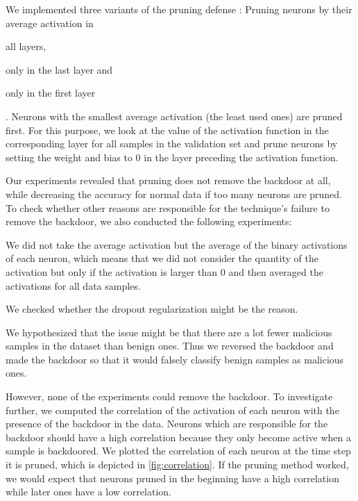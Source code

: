 \documentclass[9pt,sigconf,letterpaper,dvipsnames\ifx\removeHeaders\tempYes ,nonacm\fi]{acmart}
\begin{document}
We implemented three variants of the pruning defense \cite{gu_badnets:_2017}: Pruning neurons by their average activation in \begin{enumerate*}\item all layers, \item only in the last layer and \item only in the first layer \end{enumerate*}. Neurons with the smallest average activation (the least used ones) are pruned first. For this purpose, we look at the value of the activation function
in the corresponding layer for all samples in the validation set and prune neurons by setting the weight and bias to 0 in the layer preceding the activation function.

Our experiments revealed that pruning does not remove the backdoor at all, while decreasing the accuracy for normal data if too many neurons are pruned. To check whether other reasons are responsible for the technique's failure to remove the backdoor, we also conducted the following experiments: \begin{enumerate*} \item We did not take the average activation but the average of the binary activations of each neuron, which means that we did not consider the quantity of the activation but only if the activation is larger than 0 and then averaged the activations for all data samples. \item We checked whether the dropout regularization might be the reason. \item We hypothesized that the issue might be that there are a lot fewer malicious samples in the dataset than benign ones. Thus we reversed the backdoor and made the backdoor so that it would falsely classify benign samples as malicious ones.
\end{enumerate*}

However, none of the experiments could remove the backdoor.
To investigate further, we computed the correlation of the activation of each neuron with the presence of the backdoor in the data. Neurons which are responsible for the backdoor should have a high correlation because they only become active when a sample is backdoored. We  plotted the correlation of each neuron at the time step it is pruned, which is depicted in \autoref{fig:correlation}. If the pruning method worked, we would expect
that neurons pruned in the beginning have a high correlation while later ones have a low correlation.
\end{document}
